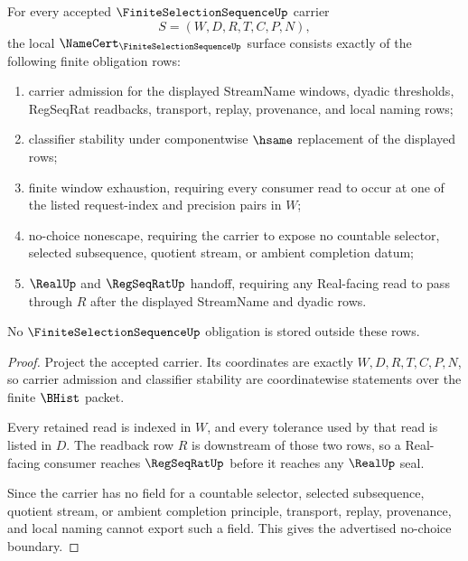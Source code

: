 \begin{theorem}
\label{thm:finite-selection-sequence-namecert-obligations}
For every accepted $\FiniteSelectionSequenceUp$ carrier
$$
S=(W,D,R,T,C,P,N),
$$
the local $\NameCert_{\FiniteSelectionSequenceUp}$ surface consists exactly of the following finite obligation rows:
\begin{enumerate}
\item carrier admission for the displayed StreamName windows, dyadic thresholds, RegSeqRat readbacks, transport, replay, provenance, and local naming rows;
\item classifier stability under componentwise $\hsame$ replacement of the displayed rows;
\item finite window exhaustion, requiring every consumer read to occur at one of the listed request-index and precision pairs in $W$;
\item no-choice nonescape, requiring the carrier to expose no countable selector, selected subsequence, quotient stream, or ambient completion datum;
\item $\RealUp$ and $\RegSeqRatUp$ handoff, requiring any Real-facing read to pass through $R$ after the displayed StreamName and dyadic rows.
\end{enumerate}
No $\FiniteSelectionSequenceUp$ obligation is stored outside these rows.
\end{theorem}
\begin{proof}
Project the accepted carrier. Its coordinates are exactly $W,D,R,T,C,P,N$, so carrier admission and classifier stability are coordinatewise statements over the finite $\BHist$ packet.

Every retained read is indexed in $W$, and every tolerance used by that read is listed in $D$. The readback row $R$ is downstream of those two rows, so a Real-facing consumer reaches $\RegSeqRatUp$ before it reaches any $\RealUp$ seal.

Since the carrier has no field for a countable selector, selected subsequence, quotient stream, or ambient completion principle, transport, replay, provenance, and local naming cannot export such a field. This gives the advertised no-choice boundary.
\end{proof}

